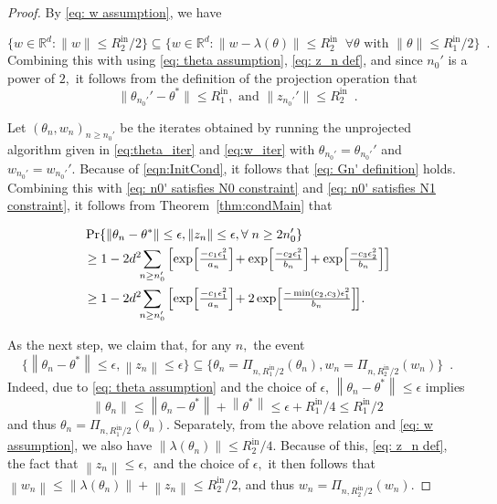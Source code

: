 \documentclass[usenames,dvipsnames,final,12pt]{colt2018} %
\newcommand{\dReal}{\mathbb{R}^d}
\newcommand{\et}{\epsilon_1}
\newcommand{\Rti}{R_1^{\textrm{in}}}
\newcommand{\thS}{\theta^*}
\newcommand{\ez}{\epsilon_2}
\newcommand{\Rzi}{R_2^{\textrm{in}}}
\newcommand{\norm}[1]{\left\lVert#1\right\rVert}
\newcommand{\gugan}[1]{#1}
\begin{document}
\begin{proof}
By \eqref{eq: w assumption}, we have
%
\gugan{
\[
\{w \in \dReal:\|w\| \leq \Rzi/2\} \subseteq \{w \in \dReal: \|w-\lambda(\theta)\| \leq \Rzi \; \; \forall \theta \mbox{ with } \|\theta\| \leq \Rti / 2 \} \enspace.
\] Combining this with using \eqref{eq: theta assumption}, \eqref{eq: z_n def}, and since} ${n_0'}$ is a power of $2,$ it follows from the definition of the projection operation that
%
\begin{equation}
\label{eqn:InitCond}
\|\theta_{n_0'}' - \thS\| \leq \Rti, \text{ and } \|z_{n_0'}'\| \leq \Rzi \enspace.
\end{equation}
%

Let $(\theta_n, w_n)_{n \geq n_0'}$ be the iterates obtained by running the unprojected algorithm given in \eqref{eq:theta_iter} and \eqref{eq:w_iter} with $\theta_{n_0'} = \theta_{n_0'}'$ and $w_{n_0'} = w_{n_0'}'.$ Because of \eqref{eqn:InitCond}, \gugan{it follows that \eqref{eq: Gn' definition} holds. Combining this with \eqref{eq: n0' satisfies N0 constraint} and \eqref{eq: n0' satisfies N1 constraint}, it follows from Theorem~\ref{thm:condMain} that}
%
\gugan{
\begin{align}
&\Pr\{
\norm{\theta_n - \thS} \leq \epsilon, \norm{z_n} \leq \epsilon, \forall\; n \geq 2n_0'\}
\notag\\
&\geq
1 -2d^2 \! \!
\sum_{n \geq n_0'}\left[
\exp\!\left[\tfrac{-c_1 \et^2}{a_n}\right] \!
+
\exp\!\left[\tfrac{-c_2 \et^2}{b_n}\right]\!
+
\exp\!\left[\tfrac{-c_3\ez^2}{b_n}\right]
\right]
\notag\\
&
\geq
1 -2d^2 \! \!
\sum_{n \geq n_0'}\left[
\exp\!\left[\tfrac{-c_1 \et^2}{a_n}\right] \!
+
2\exp\!\left[\tfrac{-\min(c_2, c_3) \et^2}{b_n}\right]\!
\right]\!.	
\label{eq: concentration of original iterates}
\end{align}
}

As the next step, we claim that, \gugan{for any $n,$ the event}
\begin{equation}
\label{eq: projection is identity}
\{\norm{\theta_{n} - \thS} \leq \epsilon, \norm{z_{n}} \leq \epsilon\}
\subseteq
\{\theta_{n} = \Pi_{n,\Rti/2}(\theta_{n}), w_{n}=\Pi_{n,\Rzi/2}(w_{n})\} \enspace.
\end{equation}
Indeed, \gugan{due to} \eqref{eq: theta assumption} and the choice of $\epsilon$, $\norm{\theta_{n}-\thS} \leq \epsilon$ implies
\begin{equation}
\label{eq: theta bounded in Rti}
\norm{\theta_{n}} \leq \norm{\theta_{n} - \thS} + \norm{\thS} \leq \epsilon + \Rti/4 \leq \Rti/2
\end{equation}
and thus $\theta_{n} = \Pi_{n,\Rti/2}(\theta_{n})$. Separately, from the above relation and \eqref{eq: w assumption}, we also have $\|\lambda(\theta_{n})\|\leq\Rzi/4.$ \gugan{Because of this,} \eqref{eq: z_n def}, the fact that $\norm{z_{n}} \leq \epsilon,$ and the choice of $\epsilon,$ it then follows that  $\norm{w_{n}} \leq \norm{\lambda(\theta_{n})}+\norm{z_n} \leq \Rzi/2$, and thus $w_{n} = \Pi_{n, \Rzi/2}(w_{n})$.



\end{proof}
\end{document}
